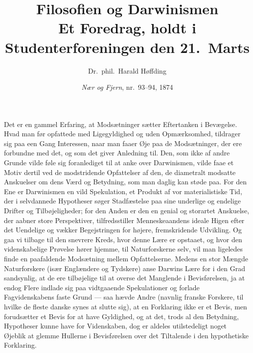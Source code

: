 \documentclass[12pt,a4paper]{article}
\title{\textbf{Filosofien og Darwinismen}\\[0.4em]
\large Et Foredrag, holdt i Studenterforeningen den 21.\ Marts}
\author{Dr.\ phil.\ Harald Høffding}
\date{\emph{Nær og Fjern}, nr.\ 93--94, 1874}
\begin{document}
\maketitle
\thispagestyle{fancy}

\bigskip

\noindent Det er en gammel Erfaring, at Modsætninger sætter Eftertanken
i Bevægelse. Hvad man før opfattede med Ligegyldighed og uden
Opmærksomhed, tildrager sig paa een Gang Interessen, naar man faaer
Øje paa de Modsætninger, der ere forbundne med det, og som det giver
Anledning til. Den, som ikke af andre Grunde vilde føle sig foranlediget
til at anke over Darwinismen, vilde faae et Motiv dertil ved de
modstridende Opfattelser af den, de diametralt modsatte Anskuelser om
dens Værd og Betydning, som man daglig kan støde paa. For den Ene er
Darwinismen en vild Spekulation, et Produkt af vor materialistiske Tid,
der i selvdannede Hypotheser søger Stadfæstelse paa sine underlige og
endelige Drifter og Tilbøjeligheder; for den Anden er den en genial og
storartet Anskuelse, der aabner store Perspektiver, tilfredsstiller
Menneskeaandens ideale Higen efter det Uendelige og vækker Begejstringen
for højere, fremskridende Udvikling. Og gaa vi tilbage til den snevrere
Kreds, hvor denne Lære er opstaaet, og hvor den videnskabelige Prøvelse
hører hjemme, til Naturforskerne selv, vil man ligeledes finde en
paafaldende Modsætning mellem Opfattelserne. Medens en stor Mængde
Naturforskere (især Englændere og Tydskere) anse Darwins Lære for i den
Grad sandsynlig, at de ere tilbøjelige til at overse det Manglende i
Bevisførelsen, ja at endog Flere indlade sig paa vidtgaaende Spekulationer
og forlade Fagvidenskabens faste Grund --- saa hævde Andre (navnlig
franske Forskere, til hvilke de fleste danske synes at slutte sig), at
en Forklaring ikke er et Bevis, men forudsætter et Bevis for at have
Gyldighed, og at det, trods al den Betydning, Hypotheser kunne have for
Videnskaben, dog er aldeles utilstedeligt noget Øjeblik at glemme
Hullerne i Bevisførelsen over det Tiltalende i den hypothetiske
Forklaring.
\end{document}
